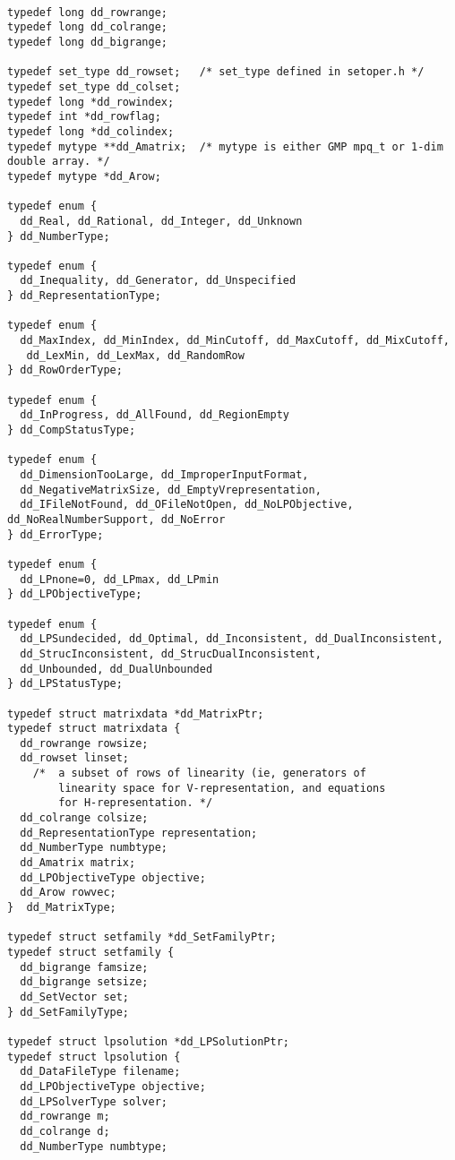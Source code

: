 \documentclass[11pt]{article}
\newcommand {\0} {{\bf 0}}
\begin{document}
\begin{verbatim}

typedef long dd_rowrange;
typedef long dd_colrange;
typedef long dd_bigrange;

typedef set_type dd_rowset;   /* set_type defined in setoper.h */
typedef set_type dd_colset;
typedef long *dd_rowindex;   
typedef int *dd_rowflag;   
typedef long *dd_colindex;
typedef mytype **dd_Amatrix;  /* mytype is either GMP mpq_t or 1-dim double array. */
typedef mytype *dd_Arow;

typedef enum {
  dd_Real, dd_Rational, dd_Integer, dd_Unknown
} dd_NumberType;

typedef enum {
  dd_Inequality, dd_Generator, dd_Unspecified
} dd_RepresentationType;

typedef enum {
  dd_MaxIndex, dd_MinIndex, dd_MinCutoff, dd_MaxCutoff, dd_MixCutoff,
   dd_LexMin, dd_LexMax, dd_RandomRow
} dd_RowOrderType;

typedef enum {
  dd_InProgress, dd_AllFound, dd_RegionEmpty
} dd_CompStatusType;

typedef enum {
  dd_DimensionTooLarge, dd_ImproperInputFormat, 
  dd_NegativeMatrixSize, dd_EmptyVrepresentation,
  dd_IFileNotFound, dd_OFileNotOpen, dd_NoLPObjective, dd_NoRealNumberSupport, dd_NoError
} dd_ErrorType;

typedef enum {
  dd_LPnone=0, dd_LPmax, dd_LPmin
} dd_LPObjectiveType;

typedef enum {
  dd_LPSundecided, dd_Optimal, dd_Inconsistent, dd_DualInconsistent,
  dd_StrucInconsistent, dd_StrucDualInconsistent,
  dd_Unbounded, dd_DualUnbounded
} dd_LPStatusType;

typedef struct matrixdata *dd_MatrixPtr;
typedef struct matrixdata {
  dd_rowrange rowsize;
  dd_rowset linset; 
    /*  a subset of rows of linearity (ie, generators of
        linearity space for V-representation, and equations
        for H-representation. */
  dd_colrange colsize;
  dd_RepresentationType representation;
  dd_NumberType numbtype;
  dd_Amatrix matrix;
  dd_LPObjectiveType objective;
  dd_Arow rowvec;
}  dd_MatrixType;

typedef struct setfamily *dd_SetFamilyPtr;
typedef struct setfamily {
  dd_bigrange famsize;
  dd_bigrange setsize;
  dd_SetVector set;  
} dd_SetFamilyType;

typedef struct lpsolution *dd_LPSolutionPtr;
typedef struct lpsolution {
  dd_DataFileType filename;
  dd_LPObjectiveType objective;
  dd_LPSolverType solver; 
  dd_rowrange m;
  dd_colrange d;
  dd_NumberType numbtype;


\end{verbatim}
\end{document}
